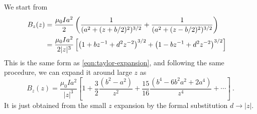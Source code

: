 \documentclass[12pt]{article}
\begin{document}
\newpage
{} We start from
\begin{align}
    B_z (z) &= \frac{\mu_0 I a^2}{2} \left(\frac{1}{(a^2 + (z+ b/2)^2)^{3/2}} + \frac{1}{(a^2 + (z- b/2)^2)^{3/2}}\right) \cr
    &= \frac{\mu_0 I a^2}{2 |z|^3} \left[\left(1+ bz^{-1} + d^2 z^{-2}\right)^{3/2} + \left(1- bz^{-1} + d^2 z^{-2}\right)^{3/2}\right]
\end{align}
This is the same form as \eqref{eqn:taylor-expansion}, and following the same procedure, we can expand it around large $z$ as
\begin{equation}
    B_z(z)= \frac{\mu_0 I a^2}{|z|^3}\left[1 + \frac{3}{2}\frac{(b^2- a^2)}{z^2} + \frac{15}{16}\frac{(b^4 - 6b^2 a^2 + 2 a^4)}{z^4} + \cdots\right]~.
\end{equation}
It is just obtained from the small $z$ expansion by the formal substitution $d \to |z|$.
\end{document}
